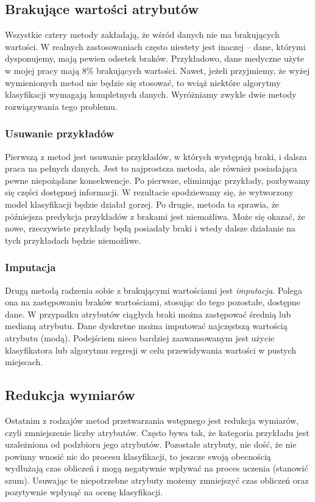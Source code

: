 \documentclass[../thesis.tex]{subfiles}
\begin{document}
\subsection{Brakujące wartości atrybutów}

Wszystkie cztery metody zakładają, że wśród danych nie ma brakujących wartości. W realnych zastosowaniach często niestety jest inaczej – dane, którymi dysponujemy, mają  pewien odsetek braków. Przykładowo, dane medyczne użyte w mojej pracy mają 8\% brakujących wartości. Nawet, jeżeli przyjmiemy, że wyżej wymienionych metod nie będzie się stosować, to wciąż niektóre algorytmy klasyfikacji wymagają kompletnych danych. Wyróżniamy zwykle dwie metody rozwiązywania tego problemu.

\subsubsection{Usuwanie przykładów}

Pierwszą z metod jest usuwanie przykładów, w których występują braki, i dalsza praca na pełnych danych. Jest to najprostsza metoda, ale również posiadająca pewne niepożądane konsekwencje. Po pierwsze, eliminując przykłady, pozbywamy się części dostępnej informacji. W rezultacie spodziewamy się, że wytworzony model klasyfikacji będzie działał gorzej. Po drugie, metoda ta sprawia, że późniejsza predykcja przykładów z brakami jest niemożliwa. Może się okazać, że nowe, rzeczywiste przykłady będą posiadały braki i wtedy dalsze działanie na tych przykładach będzie niemożliwe.

\subsubsection{Imputacja}

Drugą metodą radzenia sobie z brakującymi wartościami jest \emph{imputacja}. Polega ona na zastępowaniu braków wartościami, stosując do tego pozostałe, dostępne dane. W przypadku atrybutów ciągłych braki można zastępować średnią lub medianą atrybutu. Dane dyskretne można imputować najczęstszą wartością atrybutu (modą). Podejściem nieco bardziej zaawansowanym jest użycie klasyfikatora lub algorytmu regresji w celu przewidywania wartości w pustych miejscach.

\subsection{Redukcja wymiarów}

Ostatnim z rodzajów metod przetwarzania wstępnego jest redukcja wymiarów, czyli zmniejszenie liczby atrybutów. Często bywa tak, że kategoria przykładu jest uzależniona od podzbioru jego atrybutów. Pozostałe atrybuty, nie dość, że nie powinny wnosić nic do procesu klasyfikacji, to jeszcze swoją obecnością wydłużają czas obliczeń i mogą negatywnie wpływać na proces uczenia (stanowić szum). Usuwając te niepotrzebne atrybuty możemy zmniejszyć czas obliczeń oraz pozytywnie wpłynąć na ocenę klasyfikacji. 
\end{document}
